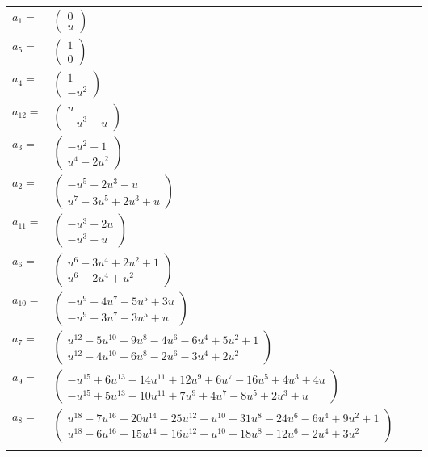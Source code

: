 \documentclass[1p]{elsarticle_modified}
\theoremstyle{definition}
\begin{document}
\begin{tabular}{m{7pt} m{180pt} m{7pt} m{180pt} }
\flushright $a_{1}=$&$\begin{pmatrix}0\\u\end{pmatrix}$ \\
\flushright $a_{5}=$&$\begin{pmatrix}1\\0\end{pmatrix}$ \\
\flushright $a_{4}=$&$\begin{pmatrix}1\\- u^2\end{pmatrix}$ \\
\flushright $a_{12}=$&$\begin{pmatrix}u\\- u^3+u\end{pmatrix}$ \\
\flushright $a_{3}=$&$\begin{pmatrix}- u^2+1\\u^4-2 u^2\end{pmatrix}$ \\
\flushright $a_{2}=$&$\begin{pmatrix}- u^5+2 u^3- u\\u^7-3 u^5+2 u^3+u\end{pmatrix}$ \\
\flushright $a_{11}=$&$\begin{pmatrix}- u^3+2 u\\- u^3+u\end{pmatrix}$ \\
\flushright $a_{6}=$&$\begin{pmatrix}u^6-3 u^4+2 u^2+1\\u^6-2 u^4+u^2\end{pmatrix}$ \\
\flushright $a_{10}=$&$\begin{pmatrix}- u^9+4 u^7-5 u^5+3 u\\- u^9+3 u^7-3 u^5+u\end{pmatrix}$ \\
\flushright $a_{7}=$&$\begin{pmatrix}u^{12}-5 u^{10}+9 u^8-4 u^6-6 u^4+5 u^2+1\\u^{12}-4 u^{10}+6 u^8-2 u^6-3 u^4+2 u^2\end{pmatrix}$ \\
\flushright $a_{9}=$&$\begin{pmatrix}- u^{15}+6 u^{13}-14 u^{11}+12 u^9+6 u^7-16 u^5+4 u^3+4 u\\- u^{15}+5 u^{13}-10 u^{11}+7 u^9+4 u^7-8 u^5+2 u^3+u\end{pmatrix}$ \\
\flushright $a_{8}=$&$\begin{pmatrix}u^{18}-7 u^{16}+20 u^{14}-25 u^{12}+u^{10}+31 u^8-24 u^6-6 u^4+9 u^2+1\\u^{18}-6 u^{16}+15 u^{14}-16 u^{12}- u^{10}+18 u^8-12 u^6-2 u^4+3 u^2\end{pmatrix}$\\&\end{tabular}
\end{document}
